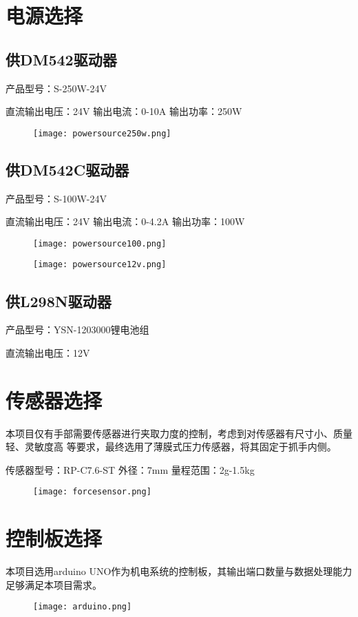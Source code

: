\section{电源选择}

\subsection{供DM542驱动器}

产品型号：S-250W-24V

直流输出电压：24V  \qquad \qquad 输出电流：0-10A \qquad \qquad 输出功率：250W

\begin{figure}[!htp]
    \centering
    \texttt{[image: powersource250w.png]}
    \label{fig:250W}
\end{figure}

\subsection{供DM542C驱动器}

产品型号：S-100W-24V

直流输出电压：24V  \qquad \qquad 输出电流：0-4.2A \qquad \qquad 输出功率：100W
\begin{figure}[!htp]
    \centering
    \texttt{[image: powersource100.png]}
    \label{fig:100W}
\end{figure}
\begin{figure}[!htp]
    \centering
    \texttt{[image: powersource12v.png]}
    \label{fig:12V}
\end{figure}
\subsection{供L298N驱动器}

产品型号：YSN-1203000锂电池组

直流输出电压：12V

\section{传感器选择}

本项目仅有手部需要传感器进行夹取力度的控制，考虑到对传感器有尺寸小、质量轻、灵敏度高
等要求，最终选用了薄膜式压力传感器，将其固定于抓手内侧。

传感器型号：RP-C7.6-ST \qquad 外径：7mm \qquad 量程范围：2g-1.5kg
\begin{figure}[!htp]
    \centering
    \texttt{[image: forcesensor.png]}
    \label{fig:压力传感器}
\end{figure}
\section{控制板选择}

本项目选用arduino UNO作为机电系统的控制板，其输出端口数量与数据处理能力
足够满足本项目需求。

\begin{figure}[!htp]
    \centering
    \texttt{[image: arduino.png]}
    \label{fig:arduino}
\end{figure}